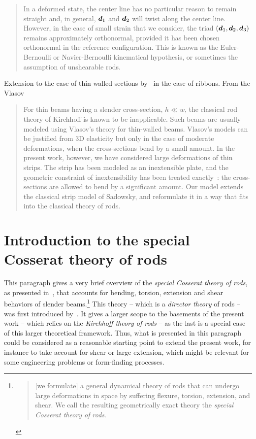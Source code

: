 \blockcquote[p.~68]{Audoly2010}{In a deformed state, the center line has no particular reason to remain straight and, in general, $\boldsymbol{d}_1$ and $\boldsymbol{d}_2$ will twist along the center line. However, in the case of small strain that we consider, the triad $(\boldsymbol{d}_1,\boldsymbol{d}_2,\boldsymbol{d}_3)$ remains approximately orthonormal, provided it has been chosen orthonormal in the reference configuration. This is known as the Euler-Bernoulli or Navier-Bernoulli kinematical hypothesis, or sometimes the assumption of unshearable rods.}

Extension to the case of thin-walled sections by~\cite{Dias2015, Vetyukov2014} in the case of ribbons. From the Vlasov

\blockcquote[p.]{Dias2014}{For thin beams having a slender cross-section, $h \ll w$, the classical rod theory of Kirchhoff is known to be inapplicable. Such beams are usually modeled using Vlasov’s theory for thin-walled beams. Vlasov’s models can be justified from 3D elasticity but only in the case of moderate deformations, when the cross-sections bend by a small amount. In the present work, however, we have considered large deformations of thin strips. The strip has been modeled as an inextensible  plate, and the geometric  constraint of inextensibility has been treated exactly~: the cross-sections are allowed to bend by a significant amount. Our model extends the classical strip model of Sadowsky, and reformulate it in a way that fits into the classical theory of rods.}

\clearpage
\section{Introduction to the special Cosserat theory of rods}

This paragraph gives a very brief overview of the \emph{special Cosserat theory of rods}, as presented in~\cite{Antman2005}, that accounts for bending, torsion, extension and shear  behaviors of slender beams.\footnote{\blockcquote[p.~270]{Antman2005}{[we formulate] a general dynamical theory of rods that can undergo large deformations in space by suffering flexure, torsion, extension, and shear. We call the resulting geometrically exact theory the \emph{special Cosserat theory of rods}.}} This theory -- which is a \emph{director theory} of rods -- was first introduced by~\cite{Antman1974}. It gives a larger scope to the basements of the present work -- which relies on the \emph{Kirchhoff theory of rods} -- as the last is a special case of this larger theoretical framework. Thus, what is presented in this paragraph could be considered as a reasonable starting point to extend the present work, for instance to take account for shear or large extension, which might be relevant for some engineering problems or form-finding processes.

